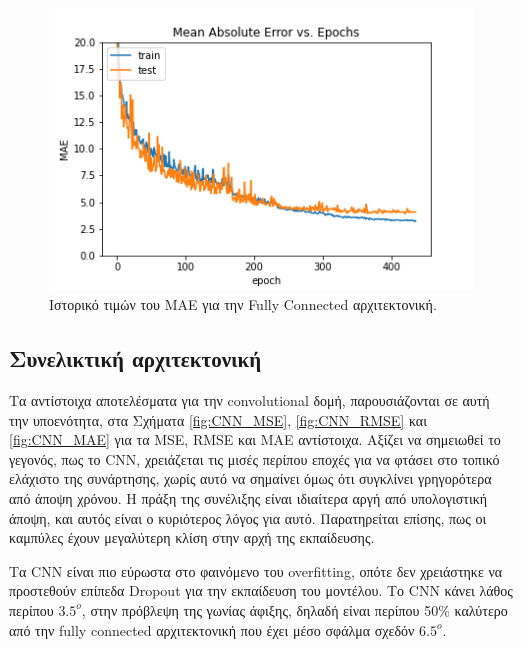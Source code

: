 \begin{figure}[h!]
  \centering
  \includegraphics[width=\textwidth]{images/FC_MAE.png}
  \caption{Ιστορικό τιμών του MAE για την Fully Connected αρχιτεκτονική.}
  \label{fig:FC_MAE}
\end{figure}

\newpage
\subsection{Συνελικτική αρχιτεκτονική}

Τα αντίστοιχα αποτελέσματα για την convolutional δομή, παρουσιάζονται σε αυτή την υποενότητα, στα Σχήματα \ref{fig:CNN_MSE}, \ref{fig:CNN_RMSE} και \ref{fig:CNN_MAE} για τα MSE, RMSE και MAE αντίστοιχα. Αξίζει να σημειωθεί το γεγονός, πως το CNN, χρειάζεται τις μισές περίπου εποχές για να φτάσει στο τοπικό ελάχιστο της συνάρτησης, χωρίς αυτό να σημαίνει όμως ότι συγκλίνει γρηγορότερα από άποψη χρόνου. Η πράξη της συνέλιξης είναι ιδιαίτερα αργή από υπολογιστική άποψη, και αυτός είναι ο κυριότερος λόγος για αυτό. Παρατηρείται επίσης, πως οι καμπύλες έχουν μεγαλύτερη κλίση στην αρχή της εκπαίδευσης. 

Τα CNN είναι πιο εύρωστα στο φαινόμενο του overfitting, οπότε δεν χρειάστηκε να προστεθούν επίπεδα Dropout για την εκπαίδευση του μοντέλου. Το CNN κάνει λάθος περίπου $3.5^o$, στην πρόβλεψη της γωνίας άφιξης, δηλαδή είναι περίπου 50\% καλύτερο από την fully connected αρχιτεκτονική που έχει μέσο σφάλμα σχεδόν $6.5^o$.

